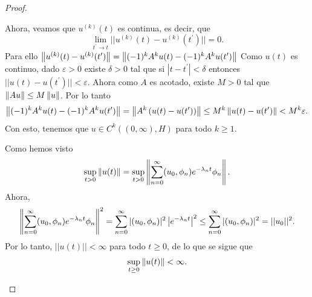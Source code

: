 \begin{proof}
\begin{enumerate}
Ahora, veamos que $u^{(k)}(t)$ es continua, es decir, que \[\lim_{t^{\prime}\rightarrow t}||u^{(k)}(t)-u^{(k)}(t^{\prime})||=0.\]
Para ello
$\left\|u^{(k)}(t)-u^{(k)}(t^{\prime})\right\|=\left\|(-1)^{k}A^{k}u(t)-(-1)^{k}A^{k}u(t^{\prime})\right\|$
Como $u(t)$ es continuo, dado $\varepsilon>0$ existe $\delta>0$ tal que si $|t-t^{\prime}|<\delta$ entonces $||u(t)-u(t^{\prime})||<\varepsilon$.
Ahora como $A$ es acotado, existe $M>0$ tal que $\left\|Au\right\|\le M\left\|u\right\|$.
Por lo tanto
\begin{align*}
 \left\|(-1)^{k}A^{k}u(t)-(-1)^{k}A^{k}u(t^{\prime})\right\|=\left\|A^{k}\left(u(t)-u(t^{\prime})\right)\right\| \le M^k \left\|u(t)-u(t')\right\| < M^k \varepsilon.   
\end{align*}
Con esto, tenemos que $u\in C^{k}((0,\infty),H)$ para todo $k\ge1$.

Como hemos visto
\[\sup_{t>0}\left\|u(t)\right\|=\sup_{t>0}\left\|\sum_{n=0}^{\infty}(u_{0},\phi_{n})e^{-\lambda_{n}t}\phi_{n}\right\|.\]
Ahora,
\begin{align*}
\left\|\sum_{n=0}^{\infty}(u_{0},\phi_{n})e^{-\lambda_{n}t}\phi_{n}\right\|^{2}=\sum_{n=0}^{\infty}|(u_{0},\phi_{n})|^{2}\left|e^{-\lambda_{n}t}\right|^{2}
\le\sum_{n=0}^{\infty}|(u_{0},\phi_{n})|^{2}=||u_0||^2.
\end{align*}
Por lo tanto, $||u(t)||<\infty$ para todo $t\ge0$, de lo que se sigue que \[\sup_{t\ge0}\left\|u(t)\right\|<\infty.\]




\end{enumerate}
\end{proof}
